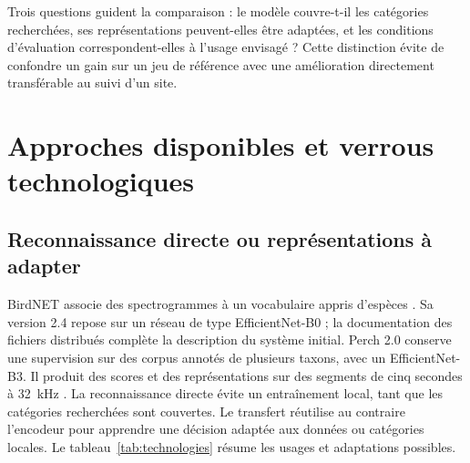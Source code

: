 \documentclass{technology_watch}
\begin{document}
Trois questions guident la comparaison : le modèle couvre-t-il les catégories
recherchées, ses représentations peuvent-elles être adaptées, et les conditions
d'évaluation correspondent-elles à l'usage envisagé ? Cette distinction évite
de confondre un gain sur un jeu de référence avec une amélioration directement
transférable au suivi d'un site.

\section{Approches disponibles et verrous technologiques}

\subsection{Reconnaissance directe ou représentations à adapter}

BirdNET associe des spectrogrammes à un vocabulaire appris d'espèces
\cite{kahl2021}. Sa version 2.4 repose sur un réseau de type EfficientNet-B0 ;
la documentation des fichiers distribués complète la description du système
initial\cite{birdnetmodels,birdnet24weights}. Perch 2.0 conserve une supervision
sur des corpus annotés de plusieurs taxons, avec un EfficientNet-B3. Il produit
des scores et des représentations sur des segments de cinq secondes à 32~kHz
\cite{perch2025}. La reconnaissance directe évite un entraînement local, tant que
les catégories recherchées sont couvertes. Le transfert réutilise au contraire
l'encodeur pour apprendre une décision adaptée aux données ou catégories locales.
Le tableau~\ref{tab:technologies} résume les usages et adaptations possibles.
\end{document}
